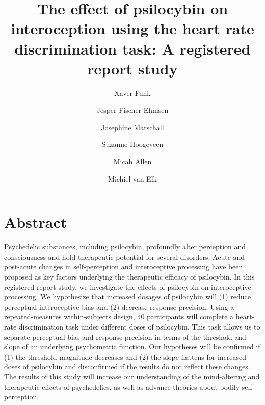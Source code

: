 \documentclass{article}
\title{The effect of psilocybin on interoception using the heart rate discrimination task: A registered report study}
\author{Xaver Funk  \and
  Jesper Fischer Ehmsen
    \and 
  Josephine Marschall
  \and
  Suzanne Hoogeveen
  \and
  Micah Allen
  \and
  Michiel van Elk}
\begin{document}
\maketitle


\section{Abstract}
\begin{comment}
    The abstract of your Stage 1 Registered Report protocol should not exceed 150 words and should not contain any references. It should start with a sentence that introduces the general topic and its significance for a broad audience. It should then describe the specific question(s) your research addresses, what you will do, and broadly, what results would confirm or disconfirm your hypotheses. The abstract can be brief and will be slightly revised at Stage 2 submission to include the results.
\end{comment}
Psychedelic substances, including psilocybin, profoundly alter perception and consciousness and hold therapeutic potential for several disorders.
Acute and post-acute changes in self-perception and interoceptive processing have been proposed as key factors underlying the therapeutic efficacy of psilocybin. 
In this registered report study, we investigate the effects of psilocybin on interoceptive processing. We hypothesize that increased dosages of psilocybin will (1) reduce perceptual interoceptive bias and (2) decrease response precision.
Using a repeated-measures within-subjects design, 40 participants will complete a heart-rate discrimination task under different doses of psilocybin. This task allows us to separate perceptual bias and response precision in terms of the threshold and slope of an underlying psychometric function.
Our hypotheses will be confirmed if (1) the threshold magnitude decreases and (2) the slope flattens for increased doses of psilocybin and disconfirmed if the results do not reflect these changes.
The results of this study will increase our understanding of the mind-altering and therapeutic effects of psychedelics, as well as advance theories about bodily self-perception.
\end{document}
